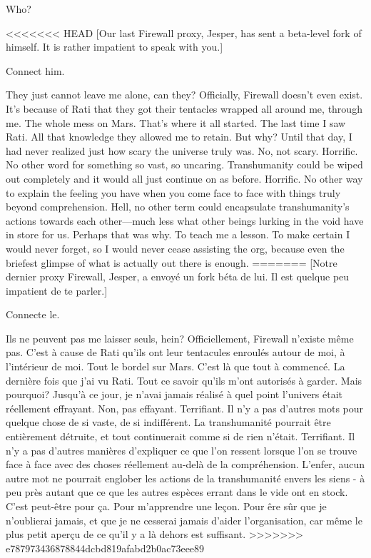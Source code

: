 Who? 

<<<<<<< HEAD
[Our last Firewall proxy, Jesper, has sent a beta-level fork of himself. It is rather impatient to speak with you.] 

Connect him. 

They just cannot leave me alone, can they? Officially, Firewall doesn't even exist. It's because of Rati that they got their tentacles wrapped all around me, through me. The whole mess on Mars. That's where it all started. The last time I saw Rati. All that knowledge they allowed me to retain. But why? Until that day, I had never realized just how scary the universe truly was. No, not scary. Horrific. No other word for something so vast, so uncaring. Transhumanity could be wiped out completely and it would all just continue on as before. Horrific. No other way to explain the feeling you have when you come face to face with things truly beyond comprehension. Hell, no other term could encapsulate transhumanity's actions towards each other—much less what other beings lurking in the void have in store for us. Perhaps that was why. To teach me a lesson. To make certain I would never forget, so I would never cease assisting the org, because even the briefest glimpse of what is actually out there is enough. 
=======
[Notre dernier proxy Firewall, Jesper, a envoyé un fork béta de lui. Il est quelque peu impatient de te parler.] 

Connecte le. 

Ils ne peuvent pas me laisser seuls, hein? Officiellement, Firewall n'existe même pas. C'est à cause de Rati qu'ils ont leur tentacules enroulés autour de moi, à l'intérieur de moi. Tout le bordel sur Mars. C'est là que tout à commencé. La dernière fois que j'ai vu Rati. Tout ce savoir qu'ils m'ont autorisés à garder. Mais pourquoi? Jusqu'à ce jour, je n'avai jamais réalisé à quel point l'univers était réellement effrayant. Non, pas effayant. Terrifiant. Il n'y a pas d'autres mots pour quelque chose de si vaste, de si indifférent. La transhumanité pourrait être entièrement détruite, et tout continuerait comme si de rien n'était. Terrifiant. Il n'y a pas d'autres manières d'expliquer ce que l'on ressent lorsque l'on se trouve face à face avec des choses réellement au-delà de la compréhension. L'enfer, aucun autre mot ne pourrait englober les actions de la transhumanité envers les siens - à peu près autant que ce que les autres espèces errant dans le vide ont en stock. C'est peut-être pour ça. Pour m'apprendre une leçon. Pour êre sûr que je n'oublierai jamais, et que je ne cesserai jamais d'aider l'organisation, car même le plus petit aperçu de ce qu'il y a là dehors est suffisant. 
>>>>>>> e787973436878844dcbd819afabd2b0ac73eee89

